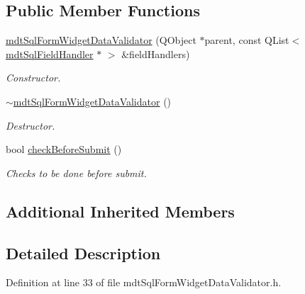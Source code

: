 \subsection*{Public Member Functions}
\begin{DoxyCompactItemize}
\item 
\hyperlink{classmdt_sql_form_widget_data_validator_af26a73385c7e737abb2dbc39e7301cfa}{mdt\-Sql\-Form\-Widget\-Data\-Validator} (Q\-Object $\ast$parent, const Q\-List$<$ \hyperlink{classmdt_sql_field_handler}{mdt\-Sql\-Field\-Handler} $\ast$ $>$ \&field\-Handlers)
\begin{DoxyCompactList}\small\item\em Constructor. \end{DoxyCompactList}\item 
\hyperlink{classmdt_sql_form_widget_data_validator_aec2505ec4b25b1fae3e37cd13f4afe07}{$\sim$mdt\-Sql\-Form\-Widget\-Data\-Validator} ()
\begin{DoxyCompactList}\small\item\em Destructor. \end{DoxyCompactList}\item 
bool \hyperlink{classmdt_sql_form_widget_data_validator_aa577e4acf4d0f371c45a67c18c59a924}{check\-Before\-Submit} ()
\begin{DoxyCompactList}\small\item\em Checks to be done before submit. \end{DoxyCompactList}\end{DoxyCompactItemize}
\subsection*{Additional Inherited Members}


\subsection{Detailed Description}


Definition at line 33 of file mdt\-Sql\-Form\-Widget\-Data\-Validator.\-h.



